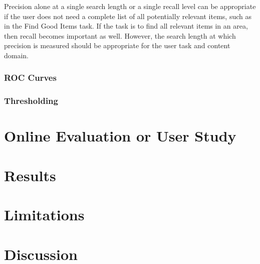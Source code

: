 Precision alone at a single search length or a single recall level can be appropriate
if the user does not need a complete list of all potentially relevant
items, such as in the Find Good Items task. If the task is to find all relevant
items in an area, then recall becomes important as well. However, the search
length at which precision is measured should be appropriate for the user task
and content domain.


\subsubsection{ROC Curves}

\subsubsection{Thresholding}

\section{Online Evaluation or User Study}

\section{Results}

\section{Limitations}

\section{Discussion}





